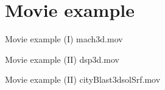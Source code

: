 \section{Movie example}
\begin{frame}{Movie example (I)}
  \centering
  mach3d.mov
\end{frame}

\begin{frame}{Movie example (II)}
  \centering
  dsp3d.mov
\end{frame}

\begin{frame}{Movie example (II)}
  \centering
  cityBlast3dsolSrf.mov
\end{frame}

